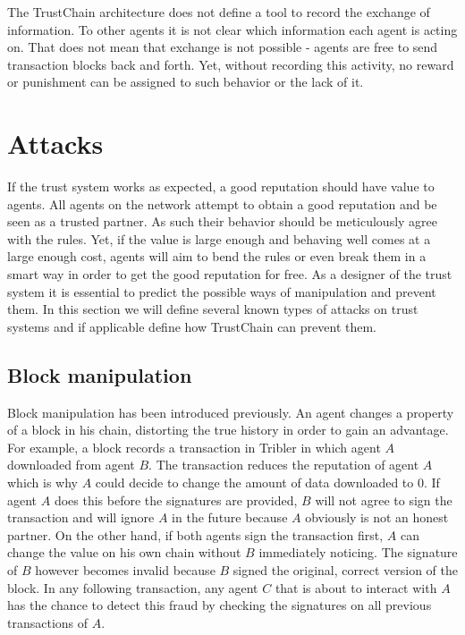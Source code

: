The TrustChain architecture does not define a tool to record the exchange of information. To other 
agents it is not clear which information each agent is acting on. That does not mean that exchange 
is not possible - agents are free to send transaction blocks back and forth. Yet, without recording
this activity, no reward or punishment can be assigned to such behavior or the lack of it. 


\section{Attacks}
\label{sec:attacks}
If the trust system works as expected, a good reputation should have value to agents. All agents on 
the network attempt to obtain a good reputation and be seen as a trusted partner. As such their 
behavior should be meticulously agree with the rules. Yet, if the value is large enough and behaving
well comes at a large enough cost, agents will aim to bend the rules or even break them in a smart 
way in order to get the good reputation for free. As a designer of the trust system it is essential
to predict the possible ways of manipulation and prevent them. In this section we will define several
known types of attacks on trust systems and if applicable define how TrustChain can prevent them.

\subsection{Block manipulation}
Block manipulation has been introduced previously. An agent changes a property of a block in his 
chain, distorting the true history in order to gain an advantage. For example, a block records a 
transaction in Tribler in which agent $A$ downloaded from agent $B$. The transaction reduces the 
reputation of agent $A$ which is why $A$ could decide to change the amount of data downloaded to 0.
If agent $A$ does this before the signatures are provided, $B$ will not agree to sign the transaction
and will ignore $A$ in the future because $A$ obviously is not an honest partner. On the other hand,
if both agents sign the transaction first, $A$ can change the value on his own chain without $B$ 
immediately noticing. The signature of $B$ however becomes invalid because $B$ signed the original, 
correct version of the block. In any following transaction, any agent $C$ that is about to interact
with $A$ has the chance to detect this fraud by checking the signatures on all previous transactions
of $A$. 

